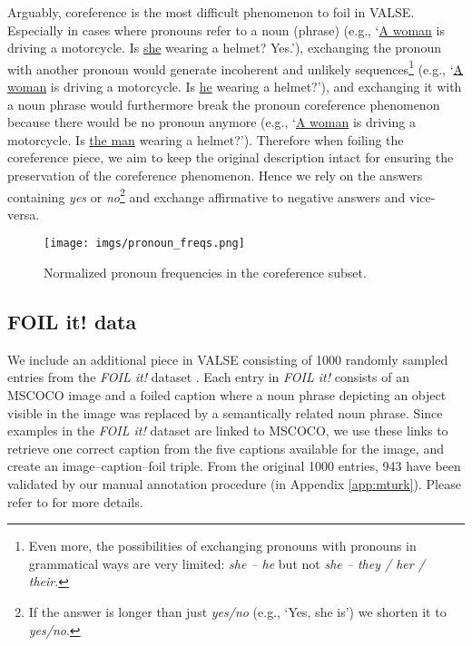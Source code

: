 \documentclass[11pt]{article}
\newcommand{\dataset}{VALSE}
\begin{document}
Arguably, coreference is the most difficult phenomenon to foil in \dataset{}. Especially in cases where pronouns refer to a noun (phrase) (e.g., `\underline{A woman} is driving a motorcycle. Is \underline{she} wearing a helmet? Yes.'), exchanging the pronoun with another pronoun would generate incoherent and unlikely sequences\footnote{Even more, the possibilities of exchanging pronouns with pronouns in grammatical ways are very limited: \emph{she -- he} but not \emph{she -- they /  her / their}.} (e.g., `\underline{A woman} is driving a motorcycle. Is \underline{he} wearing a helmet?'), and exchanging it with a noun phrase would furthermore break the pronoun coreference phenomenon because there would be no pronoun anymore (e.g., `\underline{A woman} is driving a motorcycle. Is \underline{the man} wearing a helmet?'). Therefore when foiling the coreference piece, we aim to keep the original description intact for ensuring the preservation of the coreference phenomenon. Hence we rely on the answers containing \emph{yes} or \emph{no}\footnote{If the answer is longer than just \emph{yes/no} (e.g., `Yes, she is') we shorten it to \emph{yes/no}.} and exchange affirmative to negative answers and vice-versa.


\begin{figure}
    \centering
    \texttt{[image: imgs/pronoun\_freqs.png]}
    \caption{Normalized pronoun frequencies in the coreference subset.}
    \label{fig:coref-pron-freqs}
\end{figure}

\subsection{FOIL it! data}\label{app:foilit}
We include an additional piece in \dataset{} consisting of 1000 randomly sampled entries from the \textit{FOIL it!} dataset \citep{shekhar-etal-2017-foil}.
Each entry in \textit{FOIL it!} consists of an MSCOCO \citep{Lin-etal:2014:mscoco} image and a foiled caption where a noun phrase depicting an object visible in the image was replaced by a semantically related noun phrase.
Since examples in the \textit{FOIL it!} dataset are linked to MSCOCO, we use these links to retrieve one correct caption from the five captions available for the image, and create an image--caption--foil triple.
From the original 1000 entries, 943 have been validated by our manual annotation procedure (in Appendix \ref{app:mturk}). 
Please refer to \citet{shekhar-etal-2017-foil} for more details.
\end{document}
